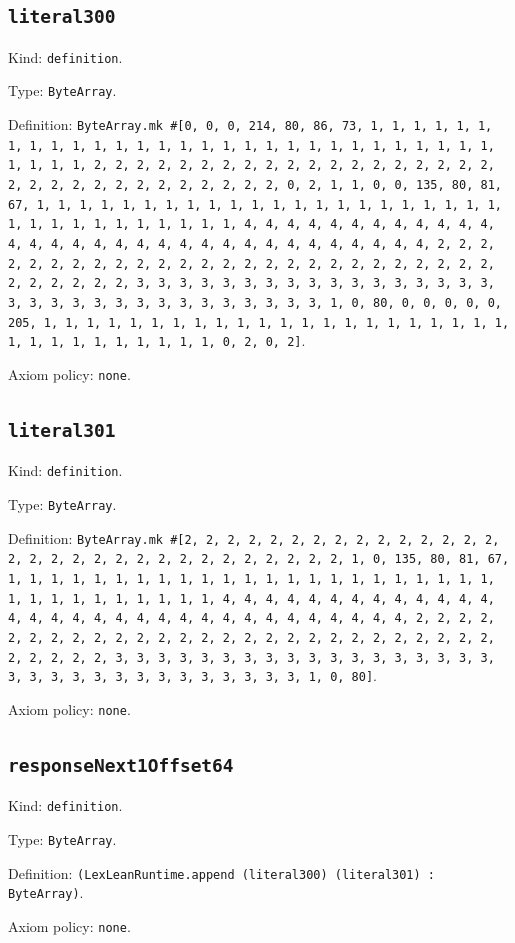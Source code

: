 \documentclass[11pt]{article}
\begin{document}
\subsection*{\texttt{literal300}}
\noindent Kind: \texttt{definition}.\par
\noindent Type: \texttt{ByteArray}.\par
\noindent Definition: \texttt{ByteArray.mk \#[0, 0, 0, 214, 80, 86, 73, 1, 1, 1, 1, 1, 1, 1, 1, 1, 1, 1, 1, 1, 1, 1, 1, 1, 1, 1, 1, 1, 1, 1, 1, 1, 1, 1, 1, 1, 1, 1, 1, 1, 2, 2, 2, 2, 2, 2, 2, 2, 2, 2, 2, 2, 2, 2, 2, 2, 2, 2, 2, 2, 2, 2, 2, 2, 2, 2, 2, 2, 2, 2, 2, 2, 0, 2, 1, 1, 0, 0, 135, 80, 81, 67, 1, 1, 1, 1, 1, 1, 1, 1, 1, 1, 1, 1, 1, 1, 1, 1, 1, 1, 1, 1, 1, 1, 1, 1, 1, 1, 1, 1, 1, 1, 1, 1, 1, 4, 4, 4, 4, 4, 4, 4, 4, 4, 4, 4, 4, 4, 4, 4, 4, 4, 4, 4, 4, 4, 4, 4, 4, 4, 4, 4, 4, 4, 4, 4, 4, 2, 2, 2, 2, 2, 2, 2, 2, 2, 2, 2, 2, 2, 2, 2, 2, 2, 2, 2, 2, 2, 2, 2, 2, 2, 2, 2, 2, 2, 2, 2, 2, 3, 3, 3, 3, 3, 3, 3, 3, 3, 3, 3, 3, 3, 3, 3, 3, 3, 3, 3, 3, 3, 3, 3, 3, 3, 3, 3, 3, 3, 3, 3, 3, 1, 0, 80, 0, 0, 0, 0, 0, 205, 1, 1, 1, 1, 1, 1, 1, 1, 1, 1, 1, 1, 1, 1, 1, 1, 1, 1, 1, 1, 1, 1, 1, 1, 1, 1, 1, 1, 1, 1, 1, 1, 0, 2, 0, 2]}.\par
\noindent Axiom policy: \texttt{none}.\par
\subsection*{\texttt{literal301}}
\noindent Kind: \texttt{definition}.\par
\noindent Type: \texttt{ByteArray}.\par
\noindent Definition: \texttt{ByteArray.mk \#[2, 2, 2, 2, 2, 2, 2, 2, 2, 2, 2, 2, 2, 2, 2, 2, 2, 2, 2, 2, 2, 2, 2, 2, 2, 2, 2, 2, 2, 2, 2, 1, 0, 135, 80, 81, 67, 1, 1, 1, 1, 1, 1, 1, 1, 1, 1, 1, 1, 1, 1, 1, 1, 1, 1, 1, 1, 1, 1, 1, 1, 1, 1, 1, 1, 1, 1, 1, 1, 1, 4, 4, 4, 4, 4, 4, 4, 4, 4, 4, 4, 4, 4, 4, 4, 4, 4, 4, 4, 4, 4, 4, 4, 4, 4, 4, 4, 4, 4, 4, 4, 4, 2, 2, 2, 2, 2, 2, 2, 2, 2, 2, 2, 2, 2, 2, 2, 2, 2, 2, 2, 2, 2, 2, 2, 2, 2, 2, 2, 2, 2, 2, 2, 2, 3, 3, 3, 3, 3, 3, 3, 3, 3, 3, 3, 3, 3, 3, 3, 3, 3, 3, 3, 3, 3, 3, 3, 3, 3, 3, 3, 3, 3, 3, 3, 3, 1, 0, 80]}.\par
\noindent Axiom policy: \texttt{none}.\par
\subsection*{\texttt{responseNext1Offset64}}
\noindent Kind: \texttt{definition}.\par
\noindent Type: \texttt{ByteArray}.\par
\noindent Definition: \texttt{(LexLeanRuntime.append (literal300) (literal301) : ByteArray)}.\par
\noindent Axiom policy: \texttt{none}.\par
\end{document}
